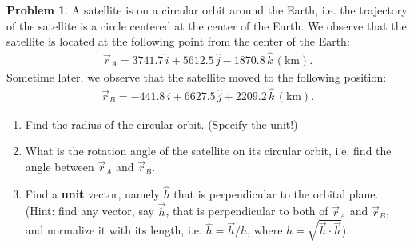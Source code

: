\documentclass[10pt]{article}
\theoremstyle{definition}
\newtheorem{prob}{Problem}[section]
\newenvironment{subprob}%
{\renewcommand{\theenumi}{\alph{enumi}}\renewcommand{\labelenumi}{(\theenumi)}\begin{enumerate}}%
{\end{enumerate}}%
\begin{document}
\begin{prob}
A satellite is on a circular orbit around the Earth, i.e. the trajectory of the satellite is a circle centered at the center of the Earth. We observe that the satellite is located at the following point from the center of the Earth:
\begin{align*}
\vec r_A = 3741.7\,\hat i +    5612.5\, \hat j  -1870.8\,\hat k\,(\mathrm{km}).
\end{align*}
Sometime later, we observe that the satellite moved to the following position:
\begin{align*}
\vec r_B = -441.8\,\hat i +    6627.5\, \hat j +2209.2\,\hat k\,(\mathrm{km}).
\end{align*}

\begin{subprob}
\item Find the radius of the circular orbit. (Specify the unit!)
\item What is the rotation angle of the satellite on its circular orbit, i.e. find the angle between $\vec r_A$ and $\vec r_B$.
\item Find a \textbf{unit} vector, namely $\hat h$ that is perpendicular to the orbital plane. (Hint: find any vector, say $\vec h$, that is perpendicular to both of $\vec r_A$ and $\vec r_B$, and normalize it with its length, i.e. $\hat h = \vec h / h$, where $h=\sqrt{\vec h \cdot \vec h}$).
\end{subprob}

\end{prob}
\end{document}

